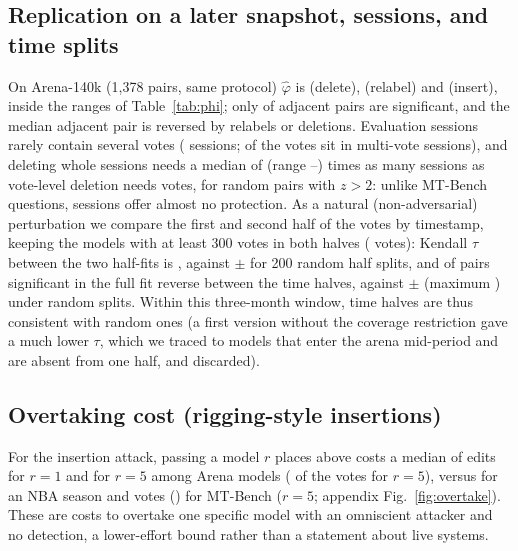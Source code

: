\documentclass{article}
\begin{document}
\begin{table}[t]
\caption{Whole-question deletion on MT-Bench: share of the 80 questions that must be removed to reverse a pair with $z>2$, compared with the share of votes at vote level (same pairs; pairs capped at 30\% of votes at vote level are excluded from the ratio, whose range is over pairs; the two medians coincide by chance, the per-pair values differ).}\label{tab:cluster}
\centering\scriptsize

\end{table}

\subsection{Replication on a later snapshot, sessions, and time splits}\label{sec:replic}
On Arena-140k (1{,}378 pairs, same protocol) $\hat\varphi$ is \NphiarenaNewdrop{} (delete), \NphiarenaNewrelabel{} (relabel) and \NphiarenaNewinsert{} (insert), inside the ranges of Table~\ref{tab:phi}; only \NadjsigarenaNew{} of adjacent pairs are significant, and the median adjacent pair is reversed by \NadjkarenaNewrelabel{} relabels or \NadjkarenaNewdrop{} deletions. Evaluation sessions rarely contain several votes (\NarenaNewSessions{} sessions; \NarenaNewMulti{} of the votes sit in multi-vote sessions), and deleting whole sessions needs a median of \Nsessratio{} (range \Nsessratiomin--\Nsessratiomax) times as many sessions as vote-level deletion needs votes, for \Nsesspairs{} random pairs with $z>2$: unlike MT-Bench questions, sessions offer almost no protection. As a natural (non-adversarial) perturbation we compare the first and second half of the votes by timestamp, keeping the \Ntempmodels{} models with at least 300 votes in both halves (\Ntempvotes{} votes): Kendall $\tau$ between the two half-fits is \Ntemptau, against \Nrandtau$\pm$\Nrandtausd{} for 200 random half splits, and \Ntemprev{} of \Nnsigtemp{} pairs significant in the full fit reverse between the time halves, against \Nrandrev$\pm$\Nrandrevsd{} (maximum \Nrandrevmax) under random splits. Within this three-month window, time halves are thus consistent with random ones (a first version without the coverage restriction gave a much lower $\tau$, which we traced to models that enter the arena mid-period and are absent from one half, and discarded).

\subsection{Overtaking cost (rigging-style insertions)}
For the insertion attack, passing a model $r$ places above costs a median of \NovertakekarenarOne{} edits for $r=1$ and \NovertakekarenarFive{} for $r=5$ among Arena models (\NovertakearenarFive{} of the votes for $r=5$), versus \NovertakeknbarFive{} for an NBA season and \NovertakekmthumanrFive{} votes (\NovertakemthumanrFive{}) for MT-Bench ($r=5$; appendix Fig.~\ref{fig:overtake}). These are costs to overtake one specific model with an omniscient attacker and no detection, a lower-effort bound rather than a statement about live systems.
\end{document}
